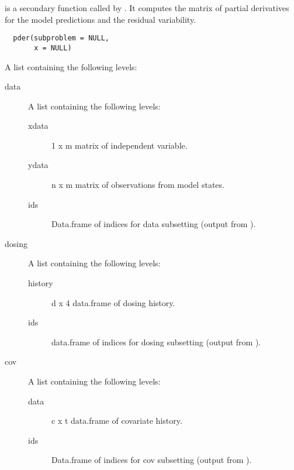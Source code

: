 %
\begin{Description}\relax
{} is a secondary function called by . It 
computes the matrix of partial derivatives for the model predictions and the
residual variability.
\end{Description}
%
\begin{Usage}
\begin{verbatim}
  pder(subproblem = NULL,
       x = NULL)
\end{verbatim}
\end{Usage}
%
\begin{Arguments}
\begin{ldescription}
\item[\code{subproblem}] A list containing the following levels:\begin{description}

\item[data] A list containing the following levels:\begin{description}

\item[xdata] 1 x m matrix of independent variable.
\item[ydata] n x m matrix of observations from model states.
\item[ids] Data.frame of indices for data subsetting (output
from ).

\end{description}

\item[dosing] A list containing the following levels:\begin{description}

\item[history] d x 4 data.frame of dosing history.
\item[ids] data.frame of indices for dosing subsetting
(output from ).

\end{description}

\item[cov] A list containing the following levels:\begin{description}

\item[data] c x t data.frame of covariate history.
\item[ids] Data.frame of indices for cov subsetting (output
from ).


\end{description}
\end{description}
\end{ldescription}
\end{Arguments}
